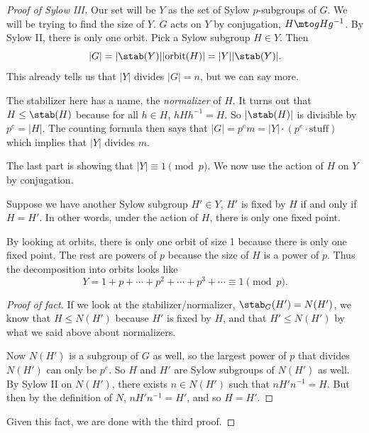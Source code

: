 \begin{proof}[Proof of Sylow III]
    Our set will be $Y$ as the set of Sylow $p$-subgroups of $G$. 
    We will be trying to find the size of $Y$.
    $G$ acts on $Y$ by conjugation, $H \mto gHg^{-1}$.
    By Sylow II, there is only one orbit. 
    Pick a Sylow subgroup $H \in Y$.
    Then $$|G| = \lvert\stab(Y)\rvert \lvert\text{orbit}(H)\rvert = |Y| \lvert\stab(Y)\rvert.$$
    This already tells us that $|Y|$ divides $|G| = n$, but we can say more.

    The stabilizer here has a name, the \emph{normalizer} of $H$. 
    It turns out that $H \leq  \stab(H)$ because for all $h \in H$, $hHh^{-1} = H$. 
    So $|\stab(H)|$ is divisible by $p^e = |H|$. 
    The counting formula then says that $|G| = p^em = |Y| \cdot (p^e \cdot \text{stuff})$ which implies that $|Y|$ divides $m$.

    The last part is showing that $|Y| \equiv 1 \pmod{p}$. 
    We now use the action of $H$ on $Y$ by conjugation. 
    \begin{fact}
        Suppose we have another Sylow subgroup $H' \in Y$, $H'$ is fixed by $H$ if and only if $H = H'$. 
        In other words, under the action of $H$, there is only one fixed point.
    \end{fact}
    By looking at orbits, there is only one orbit of size 1 because there is only one fixed point. 
    The rest are powers of $p$ because the size of $H$ is a power of $p$.
    Thus the decomposition into orbits looks like \[ Y = 1 + p + \cdots + p^2 + \cdots + p^3 + \cdots \equiv 1 \pmod{p}.\]

    \begin{proof}[Proof of fact]
        If we look at the stabilizer/normalizer, $\stab_G(H') = N(H')$, we know that $H \leq N(H')$ because $H'$ is fixed by $H$, and that $H' \leq N(H')$ by what we said above about normalizers. 
        
        Now $N(H')$ is a subgroup of $G$ as well, so the largest power of $p$ that divides $N(H')$ can only be $p^e$. 
        So $H$ and $H'$ are Sylow subgroups of $N(H')$ as well.
        By Sylow II on $N(H')$, there exists $n \in N(H')$ such that $nH'n^{-1} = H$. 
        But then by the definition of $N$, $nH' n^{-1} = H'$, and so $H = H'$. 
    \end{proof}
    
    Given this fact, we are done with the third proof.
\end{proof}

\newpage


